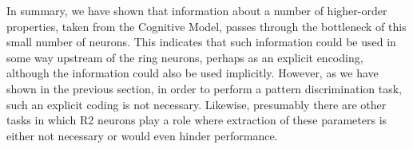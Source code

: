 In summary, we have shown that information about a number of higher-order properties, taken from the Cognitive Model, passes through the bottleneck of this small number of neurons.
This indicates that such information could be used in some way upstream of the ring neurons, perhaps as an explicit encoding, although the information could also be used implicitly.
However, as we have shown in the previous section, in order to perform a pattern discrimination task, such an explicit coding is not necessary.
Likewise, presumably there are other tasks in which R2 neurons play a role where extraction of these parameters is either not necessary or would even hinder performance.